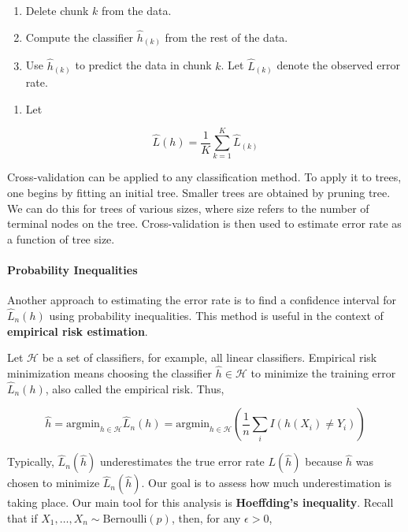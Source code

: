 \begin{enumerate}
\def\labelenumi{(\alph{enumi})}
\item
  Delete chunk \(k\) from the data.
\item
  Compute the classifier \(\hat{h}_{(k)}\) from the rest of the data.
\item
  Use \(\hat{h}_{(k)}\) to predict the data in chunk \(k\). Let
  \(\hat{L}_{(k)}\) denote the observed error rate.
\end{enumerate}

\begin{enumerate}[tightlist,label={\arabic*.},resume]
\item
  Let
\end{enumerate}

\[ \hat{L}(h) = \frac{1}{K} \sum_{k=1}^K \hat{L}_{(k)} \]

Cross-validation can be applied to any classification method. To apply
it to trees, one begins by fitting an initial tree. Smaller trees are
obtained by pruning tree. We can do this for trees of various sizes,
where size refers to the number of terminal nodes on the tree.
Cross-validation is then used to estimate error rate as a function of
tree size.

\paragraph{Probability Inequalities}\label{probability-inequalities}

Another approach to estimating the error rate is to find a confidence
interval for \(\hat{L}_n(h)\) using probability inequalities. This
method is useful in the context of \textbf{empirical risk estimation}.

Let \(\mathcal{H}\) be a set of classifiers, for example, all linear
classifiers. Empirical risk minimization means choosing the classifier
\(\hat{h} \in \mathcal{H}\) to minimize the training error
\(\hat{L}_n(h)\), also called the empirical risk. Thus,

\[ \hat{h} = \text{argmin}_{h \in \mathcal{H}} \hat{L}_n(h) 
= \text{argmin}_{h \in \mathcal{H}} \left( \frac{1}{n} \sum_i I(h(X_i) \neq Y_i) \right) \]

Typically, \(\hat{L}_n(\hat{h})\) underestimates the true error rate
\(L(\hat{h})\) because \(\hat{h}\) was chosen to minimize
\(\hat{L}_n(\hat{h})\). Our goal is to assess how much underestimation
is taking place. Our main tool for this analysis is \textbf{Hoeffding's
inequality}. Recall that if
\(X_1, \dots, X_n \sim \text{Bernoulli}(p)\), then, for any
\(\epsilon > 0\),

